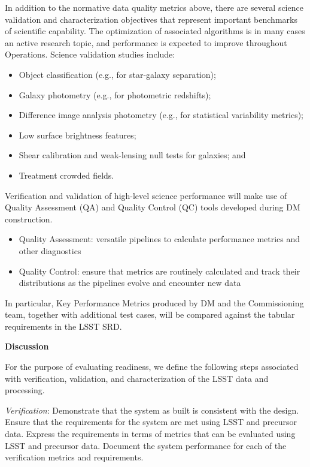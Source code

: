In addition to the normative data quality metrics above, there are several science validation and characterization objectives that represent important benchmarks of scientific capability. The optimization of associated algorithms is in many cases an active research topic, and performance is expected to improve throughout Operations. Science validation studies include:

\begin{itemize}
\item Object classification (e.g., for star-galaxy separation);
\item Galaxy photometry (e.g., for photometric redshifts);
\item Difference image analysis photometry (e.g., for statistical variability metrics);
\item Low surface brightness features;
\item Shear calibration and weak-lensing null tests for galaxies; and
\item Treatment crowded fields.
\end{itemize}

Verification and validation of high-level science performance will make use of Quality Assessment (QA) and Quality Control (QC) tools developed during DM construction.

\begin{itemize}
\item Quality Assessment: versatile pipelines to calculate performance metrics and other diagnostics
\item Quality Control: ensure that metrics are routinely calculated and track their distributions as the pipelines evolve and encounter new data
\end{itemize}

In particular, Key Performance Metrics produced by DM and the Commissioning team, together with additional test cases, will be compared against the tabular requirements in the LSST SRD. 

\textbf{Discussion}

For the purpose of evaluating readiness, we define the following steps associated with verification, validation, and characterization of the LSST data and processing.

\emph{Verification}: Demonstrate that the system as built is consistent with the design. Ensure that the requirements for the system are met using LSST and precursor data. Express the requirements in terms of metrics that can be evaluated using LSST and precursor data. Document the system performance for each of the verification metrics and requirements.

